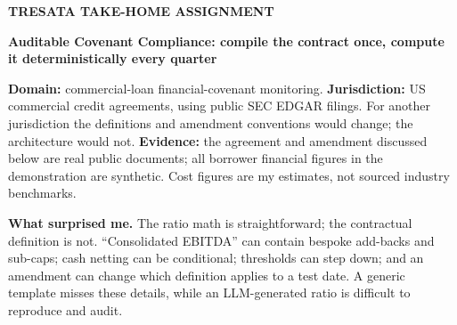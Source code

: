 \documentclass[10pt,letterpaper]{article}
\newcommand{\authorname}{}
\begin{document}
{\scriptsize\sffamily\bfseries\color{gray}\MakeUppercase{Tresata take-home assignment}\par}
\vspace{1pt}
{\raggedright\Large\bfseries\color{accent} Auditable Covenant Compliance: compile the contract once, compute it deterministically every quarter\par}
\ifx\authorname\empty\else{\small\textcolor{gray}{\authorname}\par}\fi
\vspace{-3pt}{\color{accent}\rule{\linewidth}{1.2pt}}

\textbf{Domain:} commercial-loan financial-covenant monitoring. \textbf{Jurisdiction:} US commercial credit agreements, using public SEC EDGAR filings. For another jurisdiction the definitions and amendment conventions would change; the architecture would not. \textbf{Evidence:} the agreement and amendment discussed below are real public documents; all borrower financial figures in the demonstration are synthetic. Cost figures are my estimates, not sourced industry benchmarks.

\textbf{What surprised me.} The ratio math is straightforward; the contractual definition is not. ``Consolidated EBITDA'' can contain bespoke add-backs and sub-caps; cash netting can be conditional; thresholds can step down; and an amendment can change which definition applies to a test date. A generic template misses these details, while an LLM-generated ratio is difficult to reproduce and audit.
\end{document}
